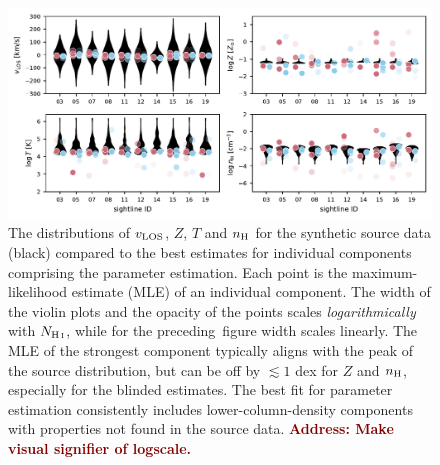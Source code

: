 \documentclass[fleqn,usenatbib]{mnras}
\newcommand{\todo}[1]{\textcolor{Maroon}{\textbf{Address: #1}}}
\begin{document}
\begin{figure}
    \centering
    \includegraphics[width=\textwidth]{figures/sample2/violin_vs_components.pdf}
    \caption{
    The distributions of $v_{\rm LOS}$, $Z$, $T$ and $n_{\rm H}$ for the synthetic source data (black) compared to the best estimates for individual components comprising the parameter estimation.
    Each point is the maximum-likelihood estimate (MLE) of an individual component.
    The width of the violin plots and the opacity of the points scales \textit{logarithmically} with $N_{\ion{H}{I}}$, while for the preceding figure width scales linearly.
    The MLE of the strongest component typically aligns with the peak of the source distribution, but can be off by $\lesssim 1$ dex for $Z$ and $n_{\rm H}$, especially for the blinded estimates.
    The best fit for parameter estimation consistently includes lower-column-density components with properties not found in the source data.
    \todo{Make visual signifier of logscale.}
    }
    \label{f: sample2 violin vs components}
\end{figure}
\end{document}
